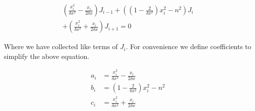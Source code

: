\documentclass[twocolumn, groupedaddress]{revtex4-1}
\begin{document}
\begin{align}
\left(\frac{x_i^2}{\delta x^2} - \frac{x_i}{2\delta x}\right) J_{i-1}			\nonumber
	+ \left( \left(1-\frac{2}{\delta x^2}\right)x_i^2 - n^2 \right) J_i		\\
	+ \left(\frac{x_i^2}{\delta x^2} + \frac{x_i}{2\delta x}\right) J_{i+1}
	= 0
\end{align}

Where we have collected like terms of $J_i$.  For convenience we define coefficients to simplify the above equation.

\begin{align}
a_i &= \frac{x_i^2}{\delta x^2} - \frac{x_i}{2\delta x} 	\\
b_i &= \left(1-\frac{2}{\delta x^2}\right)x_i^2 - n^2  	\\
c_i &= \frac{x_i^2}{\delta x^2} + \frac{x_i}{2\delta x}
\end{align}



\end{document}
